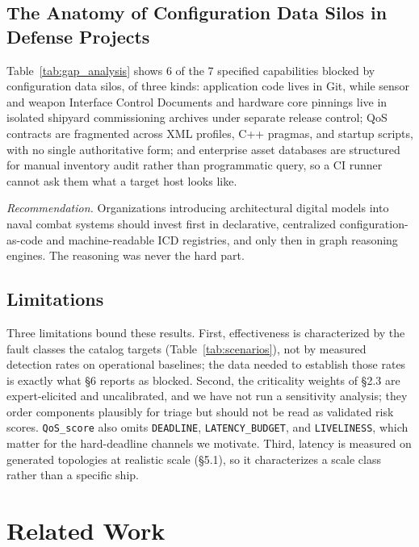 \documentclass[sigconf,9pt]{acmart}
\begin{document}
\subsection{The Anatomy of Configuration Data Silos in Defense Projects}

Table~\ref{tab:gap_analysis} shows 6 of the 7 specified capabilities blocked by configuration data silos, of three kinds: application code lives in Git, while sensor and weapon Interface Control Documents and hardware core pinnings live in isolated shipyard commissioning archives under separate release control; QoS contracts are fragmented across XML profiles, C++ pragmas, and startup scripts, with no single authoritative form; and enterprise asset databases are structured for manual inventory audit rather than programmatic query, so a CI runner cannot ask them what a target host looks like.

\emph{Recommendation.} Organizations introducing architectural digital models into naval combat systems should invest first in declarative, centralized configuration-as-code and machine-readable ICD registries, and only then in graph reasoning engines. The reasoning was never the hard part.

\subsection{Limitations}
Three limitations bound these results. First, effectiveness is characterized by the fault classes the catalog targets (Table~\ref{tab:scenarios}), not by measured detection rates on operational baselines; the data needed to establish those rates is exactly what \S6 reports as blocked. Second, the criticality weights of \S2.3 are expert-elicited and uncalibrated, and we have not run a sensitivity analysis; they order components plausibly for triage but should not be read as validated risk scores. \texttt{QoS\_score} also omits \texttt{DEADLINE}, \texttt{LATENCY\_BUDGET}, and \texttt{LIVELINESS}, which matter for the hard-deadline channels we motivate. Third, latency is measured on generated topologies at realistic scale (\S5.1), so it characterizes a scale class rather than a specific ship.

\section{Related Work}
\end{document}

